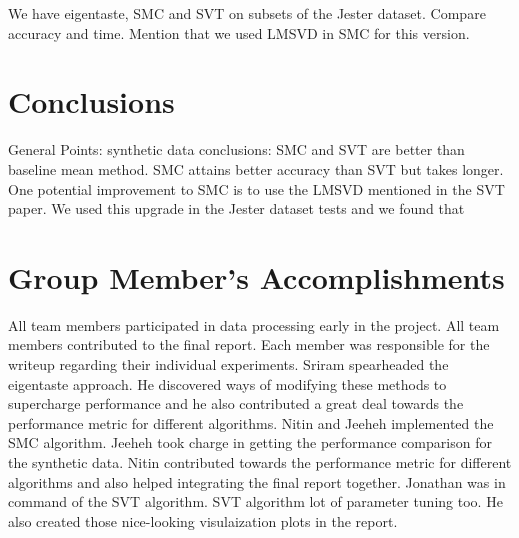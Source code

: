 \documentclass{article} %
\begin{document}
We have eigentaste, SMC and SVT on subsets of the Jester dataset.
Compare accuracy and time. 
Mention that we used LMSVD in SMC for this version.

\section{Conclusions}

General Points:
synthetic data conclusions: SMC and SVT are better than baseline mean method.
SMC attains better accuracy than SVT but takes longer.
One potential improvement to SMC is to use the LMSVD mentioned in the SVT paper. 
We used this upgrade in the Jester dataset tests and we found that 



\section{Group Member's Accomplishments}
All team members participated in data processing early in the project.
All team members contributed to the final report. Each member was responsible for the
writeup regarding their individual experiments.
Sriram spearheaded the eigentaste approach. He discovered ways of modifying these methods
to supercharge performance and he also contributed a great deal towards the performance metric for different algorithms.
Nitin and Jeeheh implemented the SMC algorithm. Jeeheh took charge in getting the performance comparison for the synthetic data. Nitin contributed towards the performance metric for different algorithms and also helped integrating the final report together.
Jonathan was in command of the SVT algorithm. SVT algorithm lot of parameter tuning too. He also created those nice-looking visulaization plots in the report.




\end{document}
